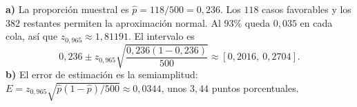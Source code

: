 \textbf{a)} La proporción muestral es $\hat p=118/500=0{,}236$. Los $118$ casos favorables y los $382$ restantes permiten la aproximación normal. Al $93\%$ queda $0{,}035$ en cada cola, así que $z_{0{,}965}\approx1{,}81191$. El intervalo es
\[
0{,}236\pm z_{0{,}965}\sqrt{\frac{0{,}236(1-0{,}236)}{500}}
\approx\boxed{[0{,}2016,\ 0{,}2704]}.
\]
\textbf{b)} El error de estimación es la semiamplitud:
$E=z_{0{,}965}\sqrt{\hat p(1-\hat p)/500}\approx\boxed{0{,}0344}$, unos $3{,}44$ puntos porcentuales.
